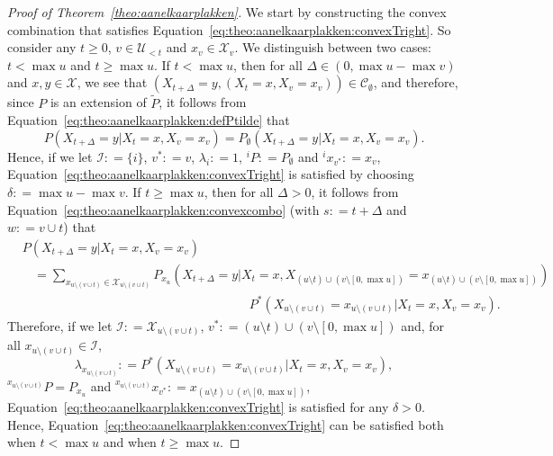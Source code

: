 \documentclass[10pt,a4paper]{paper}
\theoremstyle{definition}
\newcommand{\states}{\mathcal{X}}
\newcommand{\coloneqq}{:\!=}
\begin{document}
\begin{proof}[Proof of Theorem~\ref{theo:aanelkaarplakken}]
We start by constructing the convex combination that satisfies Equation~\eqref{eq:theo:aanelkaarplakken:convexTright}. So consider any $t\geq0$, $v\in\mathcal{U}_{<t}$ and $x_v\in\states_v$.
We distinguish between two cases: $t<\max u$ and $t\geq\max u$. If $t<\max u$, then for all $\Delta\in(0,\max u-\max v)$ and $x,y\in\states$, we see that $(X_{t+\Delta}=y,(X_t=x, X_v=x_v))\in\mathcal{C}_\emptyset$, and therefore, since $P$ is an extension of $\tilde{P}$, it follows from Equation~\eqref{eq:theo:aanelkaarplakken:defPtilde} that
\begin{equation*}
P(X_{t+\Delta}=y\vert X_t=x, X_v=x_v)
=P_\emptyset(X_{t+\Delta}=y\vert X_t=x, X_v=x_v).
\end{equation*}
Hence, if we let $\mathcal{I}\coloneqq\{i\}$, $v^*\coloneqq v$, $\lambda_i\coloneqq 1$, ${}^iP\coloneqq P_\emptyset$ and ${}^ix_{v^*}\coloneqq x_v$, Equation~\eqref{eq:theo:aanelkaarplakken:convexTright} is satisfied by choosing $\delta\coloneqq \max u-\max v$.
If $t\geq \max u$, then for all $\Delta>0$, it follows from Equation~\eqref{eq:theo:aanelkaarplakken:convexcombo} (with $s\coloneqq t+\Delta$ and $w\coloneqq v\cup t$) that
\begin{align*}
&P(X_{t+\Delta}=y\vert X_t=x, X_v=x_v)\\
&~~~~=
\sum_{x_{u\setminus(v\cup t)}\in\states_{u\setminus(v\cup t)}}
P_{x_u}(X_{t+\Delta}=y\vert X_t=x, 
X_{(u\setminus t)\cup(v\setminus [0,\max u])}= 
x_{(u\setminus t)\cup(v\setminus [0,\max u])})\\[-4mm]
&\quad\quad\quad\quad\quad\quad\quad\quad\quad\quad\quad\quad\quad\quad\quad\quad\quad\quad
P^*(X_{u\setminus(v\cup t)}=x_{u\setminus(v\cup t)}
\vert X_t=x, X_v=x_v).
\end{align*}
Therefore, if we let $\mathcal{I}\coloneqq\states_{u\setminus(v\cup t)}$, $v^*\coloneqq (u\setminus t)\cup(v\setminus [0,\max u])$ and, for all $x_{u\setminus(v\cup t)}\in \mathcal{I}$,
\begin{equation*}
\lambda_{x_{u\setminus(v\cup t)}}
\coloneqq P^*(X_{u\setminus(v\cup t)}=x_{u\setminus(v\cup t)}
\vert X_t=x, X_v=x_v),
\end{equation*}
${}^{x_{u\setminus(v\cup t)}}P=P_{x_u}$ and ${}^{x_{u\setminus(v\cup t)}}x_{v^*}\coloneqq
x_{(u\setminus t)\cup(v\setminus [0,\max u])}$, Equation~\eqref{eq:theo:aanelkaarplakken:convexTright} is satisfied for any $\delta>0$.
Hence, Equation~\eqref{eq:theo:aanelkaarplakken:convexTright} can be satisfied both when $t<\max u$ and when $t\geq \max u$.


\end{proof}
\end{document}

